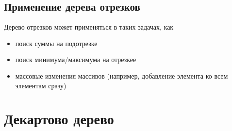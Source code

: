 \documentclass[a4paper]{article}
\begin{document}
\subsection{Применение дерева отрезков}
Дерево отрезков может применяться в таких задачах, как
\begin{itemize}
    \item поиск суммы на подотрезке
    \item поиск минимума/максимума на отрезкее
    \item массовые изменения массивов (например, добавление элемента ко всем элементам сразу)
\end{itemize}


\section{Декартово дерево}
\end{document}
